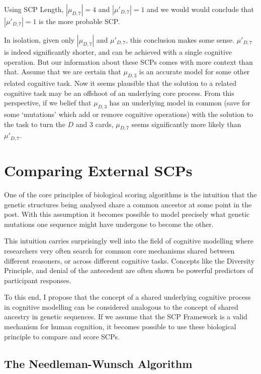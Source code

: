 Using SCP Length, $|\mu_{D,7}|=4$ and $|\mu'_{D,7}|=1$ and we would would conclude that $|\mu'_{D,7}|=1$ is the more probable SCP.

In isolation, given only $|\mu_{D,7}|$ and $\mu'_{D,7}$, this conclusion makes some sense. $\mu'_{D,7}$ is indeed significantly shorter, and can be achieved with a single cognitive operation. But our information about these SCPs comes with more context than that. Assume that we are certain that $\mu_{D,3}$ is an accurate model for some other related cognitive task. Now it seems plausible that the solution to a related cognitive task may be an offshoot of an underlying core process. From this perspective, if we belief that $\mu_{D,3}$ has an underlying model in common (save for some `mutations' which add or remove cognitive operations) with the solution to the task to turn the $D$ and $3$ cards, $\mu_{D,7}$ seems significantly more likely than $\mu'_{D,7}$.

\section{Comparing External SCPs} \label{ssec:compExt}

One of the core principles of biological scoring algorithms is the intuition that the genetic structures being analysed share a common ancestor at some point in the post. With this assumption it becomes possible to model precisely what genetic mutations one sequence might have undergone to become the other.

This intuition carries surprisingly well into the field of cognitive modelling where researchers very often search for common core mechanisms shared between different reasoners, or across different cognitive tasks. Concepts like the Diversity Principle\citep{heit2005defending}, and denial of the antecedent are often shown be powerful predictors of participant responses.

To this end, I propose that the concept of a shared underlying cognitive process in cognitive modelling can be considered analogous to the concept of shared ancestry in genetic sequences. If we assume that the SCP Framework is a valid mechanism for human cognition, it becomes possible to use these biological principle to compare and score SCPs.

\subsection{The Needleman-Wunsch Algorithm} \label{ssec:nw}

